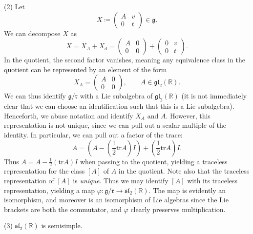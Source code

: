 \documentclass[11pt, letterpaper]{article}
\theoremstyle{plain}
\begin{document}
(2) Let
\[
	X\coloneqq \begin{pmatrix}
	A & v \\
	0 & t
	\end{pmatrix}\in \mathfrak{g} 
.\]
We can decompose $X$ as
\[
	X= X_A + X_d = \begin{pmatrix}
	A & 0 \\
	0 & 0
	\end{pmatrix}+\begin{pmatrix}
	0 & v \\
	0 & t
	\end{pmatrix}
.\]
In the quotient, the second factor vanishes, meaning any equivalence class in the quotient can be represented by an element of the form
\[
	X_A=\begin{pmatrix}
	A & 0 \\
	0 & 0
	\end{pmatrix},\qquad A\in \mathfrak{gl}_2(\mathbb{R} )
.\]
We can thus identify $\mathfrak{g} /\mathfrak{r} $ with a Lie subalgebra of $\mathfrak{gl} _2(\mathbb{R} )$ (it is not immediately clear that we can choose an identification such that this is a Lie subalgebra). Henceforth, we abuse notation and identify $X_A$ and $A$. However, this representation is not unique, since we can pull out a scalar multiple of the identity. In particular, we can pull out a factor of the trace:
\[
	A = \left(A - \left(\frac{1}{2} \mathrm{tr} A\right)I\right) + \left( \frac{1}{2} \mathrm{tr} A \right) I
.\]
Thus $A = A - \frac{1}{2}(\mathrm{tr} A)I$ when passing to the quotient, yielding a traceless representation for the class $[A]$ of $A$ in the quotient. Note also that the traceless representation of $[A]$ is \emph{unique}. Thus we may identify $[A]$ with its traceless representation, yielding a map $\varphi :\mathfrak{g} /\mathfrak{r} \to  \mathfrak{sl} _2(\mathbb{R} )$. The map is evidently an isomorphism, and moreover is an isomorphism of Lie algebras since the Lie brackets are both the commutator, and $\varphi $ clearly preserves multiplication.

(3) $\mathfrak{sl} _2(\mathbb{R} )$ is semisimple.
\end{document}
